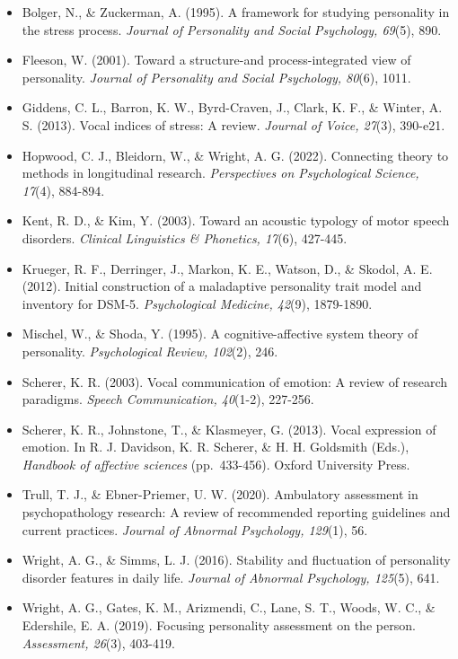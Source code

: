 \documentclass[
  english,
  man]{apa6}
\providecommand{\tightlist}{%
  \setlength{\itemsep}{0pt}\setlength{\parskip}{0pt}}
\begin{document}
\begin{itemize}
\tightlist
\item
  Bolger, N., \& Zuckerman, A. (1995). A framework for studying personality in the stress process. \emph{Journal of Personality and Social Psychology, 69}(5), 890.
\item
  Fleeson, W. (2001). Toward a structure-and process-integrated view of personality. \emph{Journal of Personality and Social Psychology, 80}(6), 1011.
\item
  Giddens, C. L., Barron, K. W., Byrd-Craven, J., Clark, K. F., \& Winter, A. S. (2013). Vocal indices of stress: A review. \emph{Journal of Voice, 27}(3), 390-e21.
\item
  Hopwood, C. J., Bleidorn, W., \& Wright, A. G. (2022). Connecting theory to methods in longitudinal research. \emph{Perspectives on Psychological Science, 17}(4), 884-894.
\item
  Kent, R. D., \& Kim, Y. (2003). Toward an acoustic typology of motor speech disorders. \emph{Clinical Linguistics \& Phonetics, 17}(6), 427-445.
\item
  Krueger, R. F., Derringer, J., Markon, K. E., Watson, D., \& Skodol, A. E. (2012). Initial construction of a maladaptive personality trait model and inventory for DSM-5. \emph{Psychological Medicine, 42}(9), 1879-1890.
\item
  Mischel, W., \& Shoda, Y. (1995). A cognitive-affective system theory of personality. \emph{Psychological Review, 102}(2), 246.
\item
  Scherer, K. R. (2003). Vocal communication of emotion: A review of research paradigms. \emph{Speech Communication, 40}(1-2), 227-256.
\item
  Scherer, K. R., Johnstone, T., \& Klasmeyer, G. (2013). Vocal expression of emotion. In R. J. Davidson, K. R. Scherer, \& H. H. Goldsmith (Eds.), \emph{Handbook of affective sciences} (pp.~433-456). Oxford University Press.
\item
  Trull, T. J., \& Ebner-Priemer, U. W. (2020). Ambulatory assessment in psychopathology research: A review of recommended reporting guidelines and current practices. \emph{Journal of Abnormal Psychology, 129}(1), 56.
\item
  Wright, A. G., \& Simms, L. J. (2016). Stability and fluctuation of personality disorder features in daily life. \emph{Journal of Abnormal Psychology, 125}(5), 641.
\item
  Wright, A. G., Gates, K. M., Arizmendi, C., Lane, S. T., Woods, W. C., \& Edershile, E. A. (2019). Focusing personality assessment on the person. \emph{Assessment, 26}(3), 403-419.
\end{itemize}
\end{document}
